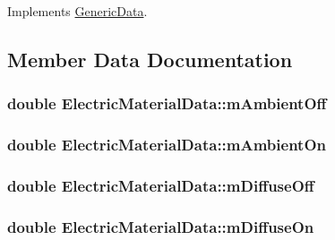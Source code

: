 Implements \hyperlink{class_generic_data_a93ea61de5b09cf3fc95564ef3d841214}{Generic\-Data}.



\subsection{Member Data Documentation}
\hypertarget{class_electric_material_data_ac403298c9ad462c7722aa6ecf5078a26}{
\subsubsection[{m\-Ambient\-Off}]{\setlength{\rightskip}{0pt plus 5cm}double Electric\-Material\-Data\-::m\-Ambient\-Off}}\label{class_electric_material_data_ac403298c9ad462c7722aa6ecf5078a26}
\hypertarget{class_electric_material_data_a5251ccabe0243a8c8a783c1e105bd151}{
\subsubsection[{m\-Ambient\-On}]{\setlength{\rightskip}{0pt plus 5cm}double Electric\-Material\-Data\-::m\-Ambient\-On}}\label{class_electric_material_data_a5251ccabe0243a8c8a783c1e105bd151}
\hypertarget{class_electric_material_data_ae26b6c78ca76ba31c349a8c17fc44989}{
\subsubsection[{m\-Diffuse\-Off}]{\setlength{\rightskip}{0pt plus 5cm}double Electric\-Material\-Data\-::m\-Diffuse\-Off}}\label{class_electric_material_data_ae26b6c78ca76ba31c349a8c17fc44989}
\hypertarget{class_electric_material_data_a142f858836d56cdfd13eff14aaea6e89}{
\subsubsection[{m\-Diffuse\-On}]{\setlength{\rightskip}{0pt plus 5cm}double Electric\-Material\-Data\-::m\-Diffuse\-On}}\label{class_electric_material_data_a142f858836d56cdfd13eff14aaea6e89}

